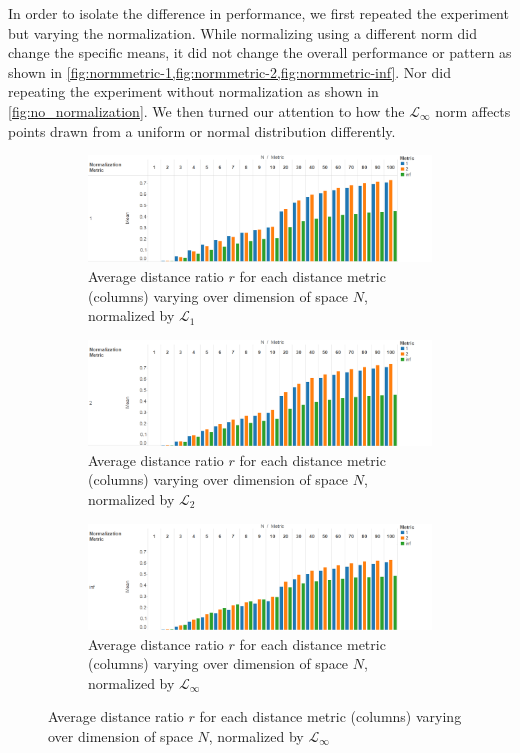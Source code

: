 \documentclass{article}
\begin{document}
In order to isolate the difference in performance, we first repeated the experiment but varying the normalization. While normalizing using a different norm did change the specific means, it did not change the overall performance or pattern as shown in \cref{fig:normmetric-1,fig:normmetric-2,fig:normmetric-inf}. Nor did repeating the experiment without normalization as shown in \cref{fig:no_normalization}. We then turned our attention to how the $\mathcal{L}_{\infty}$ norm affects points drawn from a uniform or normal distribution differently.
\
\begin{figure}[H]
\centering
\begin{subfigure}[h]{0.75\textwidth}
        \includegraphics[width=1\textwidth]{normalization_metric-1.png}
        \caption{Average distance ratio $r$ for each distance metric (columns) varying over dimension of space $N$, normalized by $\mathcal{L}_1$}
        \label{fig:normmetric-1}
\end{subfigure}
\begin{subfigure}[h]{0.75\textwidth}
        \includegraphics[width=1\textwidth]{normalization_metric-2.png}
        \caption{Average distance ratio $r$ for each distance metric (columns) varying over dimension of space $N$, normalized by $\mathcal{L}_2$}
        \label{fig:normmetric-2}
\end{subfigure}
\begin{subfigure}[h]{0.75\textwidth}
        \includegraphics[width=1\textwidth]{normalization_metric-inf.png}
        \caption{Average distance ratio $r$ for each distance metric (columns) varying over dimension of space $N$, normalized by $\mathcal{L}_{\infty}$}
        \label{fig:normmetric-inf}
\end{subfigure}
\end{figure}
\end{document}

